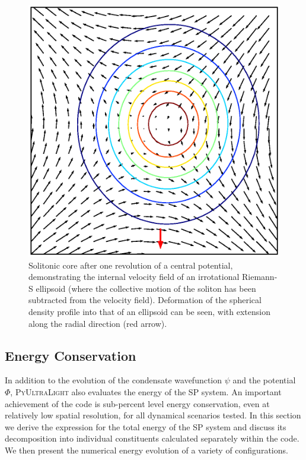 \documentclass[a4paper,11pt]{article}
\newcommand{\PyUltraLight}{\textsc{PyUltraLight }}
\begin{document}
\begin{figure}
  \includegraphics[width=1.\textwidth,trim=1cm 1cm 0 1cm,clip]{riemann}
  \caption{Solitonic core after one revolution of a central potential, demonstrating the internal velocity field of an irrotational Riemann-S ellipsoid (where the collective motion of the soliton has been subtracted from the velocity field). Deformation of the spherical density profile into that of an ellipsoid can be seen, with extension along the radial direction (red arrow).}
  \label{fig:riemann}
\end{figure}

\vspace{1em}

\subsection{Energy Conservation}\label{sec:energy}

In addition to the evolution of the condensate wavefunction $\psi$ and the potential $\Phi$, \PyUltraLight also evaluates the energy of the SP system. An important achievement of the code is sub-percent level energy conservation, even at relatively low spatial resolution, for all dynamical scenarios tested. In this section we derive the expression for the total energy of the SP system and discuss its decomposition into individual constituents calculated separately within the code. We then present the numerical energy evolution of a variety of configurations. 
\end{document}
